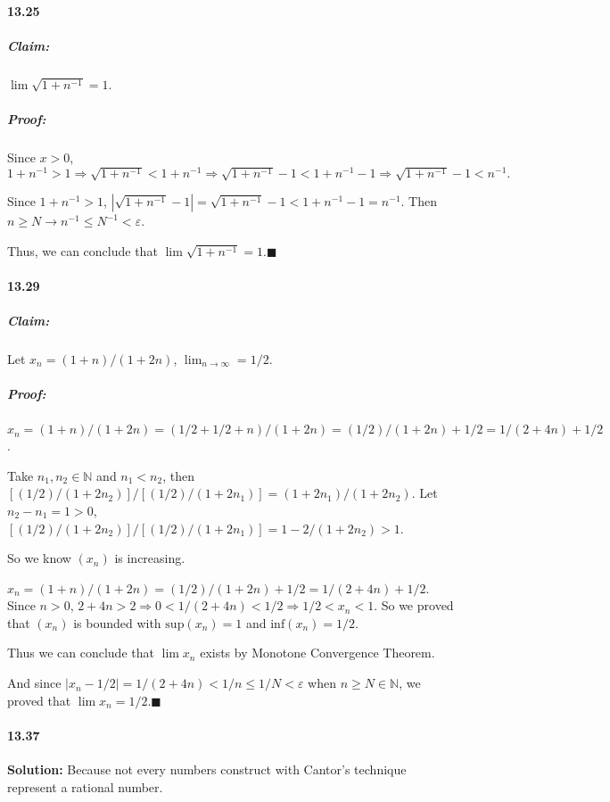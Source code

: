 \documentclass[11pt]{article}
\begin{document}
	\paragraph{13.25}
		\subparagraph{Claim:} $\lim \sqrt{1+n^{-1}} = 1$.
		\subparagraph{Proof:} Since $x > 0$, $1 + n^{-1} > 1 \Rightarrow \sqrt{1 + n^{-1}} < 1 + n^{-1} \Rightarrow \sqrt{1 + n^{-1}} - 1 < 1 + n^{-1} - 1 \Rightarrow \sqrt{1 + n^{-1}} - 1 < n^{-1}.$
		
		Since $1 + n^{-1} > 1$, $|\sqrt{1 + n^{-1}} - 1| = \sqrt{1 + n^{-1}} - 1 < 1 + n^{-1} - 1 = n^{-1}$. Then $n \geq N \rightarrow n^{-1} \leq N^{-1} < \varepsilon$.
		
		Thus, we can conclude that $\lim \sqrt{1+n^{-1}} = 1.\blacksquare$
	\paragraph{13.29}
		\subparagraph{Claim:} Let $x_n = (1 + n)/(1 + 2n)$, $\lim_{n \rightarrow \infty} = 1/2$.
		\subparagraph{Proof:} $x_n = (1 + n)/(1 + 2n) = (1/2 + 1/2 + n)/(1 + 2n) = (1/2)/(1 + 2n) + 1/2 = 1/(2  +4n) + 1/2$.
		
		Take $n_1, n_2 \in \mathbb{N}$ and $n_1 < n_2$, then $[(1/2)/(1 + 2n_2)]/[(1/2)/(1 + 2n_1)] = (1 + 2n_1)/(1 + 2n_2)$. Let $n_2 - n_1 = 1 > 0$, $[(1/2)/(1 + 2n_2)]/[(1/2)/(1 + 2n_1)] = 1 - 2/(1 + 2n_2) > 1$.
		
		So we know $(x_n)$ is increasing.
		
		$x_n = (1 + n)/(1 + 2n) = (1/2)/(1 + 2n) + 1/2 = 1/(2 + 4n) + 1/2$. Since $n > 0$, $2 + 4n > 2 \Rightarrow 0 < 1/(2 + 4n) < 1/2 \Rightarrow 1/2 < x_n < 1$. So we proved that $(x_n)$ is bounded with $\mathrm{sup}(x_n) = 1$ and $\mathrm{inf}(x_n) = 1/2$.
		
		Thus we can conclude that $\lim x_n$ exists by Monotone Convergence Theorem.
		
		And since $|x_n - 1/2| = 1/(2 + 4n) < 1/n \leq 1/N < \varepsilon$ when $n \geq N \in \mathbb{N}$, we proved that $\lim x_n = 1/2.\blacksquare$    
	\paragraph{13.37}\textbf{Solution:}
		Because not every numbers construct with Cantor's technique represent a rational number.
\end{document}
